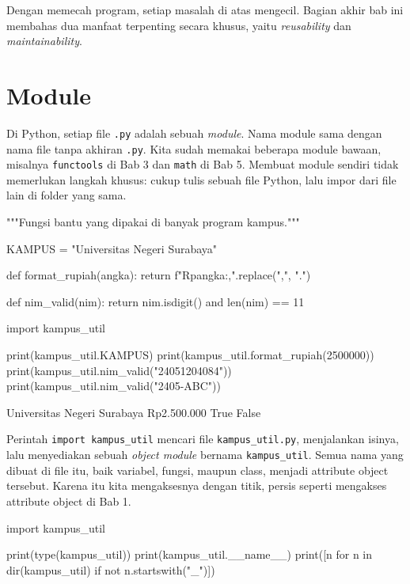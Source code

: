 Dengan memecah program, setiap masalah di atas mengecil. Bagian akhir bab ini membahas dua manfaat terpenting secara khusus, yaitu \emph{reusability} dan \emph{maintainability}.

\section{Module}

Di Python, setiap file \texttt{.py} adalah sebuah \emph{module}. Nama module sama dengan nama file tanpa akhiran \texttt{.py}. Kita sudah memakai beberapa module bawaan, misalnya \texttt{functools} di Bab 3 dan \texttt{math} di Bab 5. Membuat module sendiri tidak memerlukan langkah khusus: cukup tulis sebuah file Python, lalu impor dari file lain di folder yang sama.

\begin{kode}
"""Fungsi bantu yang dipakai di banyak program kampus."""

KAMPUS = "Universitas Negeri Surabaya"

def format_rupiah(angka):
    return f"Rp{angka:,}".replace(",", ".")

def nim_valid(nim):
    return nim.isdigit() and len(nim) == 11
\end{kode}

\begin{kode}[main.py]
import kampus_util

print(kampus_util.KAMPUS)
print(kampus_util.format_rupiah(2500000))
print(kampus_util.nim_valid("24051204084"))
print(kampus_util.nim_valid("2405-ABC"))
\end{kode}

\begin{keluaran}
Universitas Negeri Surabaya
Rp2.500.000
True
False
\end{keluaran}

Perintah \texttt{import kampus\_util} mencari file \texttt{kampus\_util.py}, menjalankan isinya, lalu menyediakan sebuah \emph{object module} bernama \texttt{kampus\_util}. Semua nama yang dibuat di file itu, baik variabel, fungsi, maupun class, menjadi attribute object tersebut. Karena itu kita mengaksesnya dengan titik, persis seperti mengakses attribute object di Bab 1.

\begin{kode}
import kampus_util

print(type(kampus_util))
print(kampus_util.__name__)
print([n for n in dir(kampus_util) if not n.startswith("_")])
\end{kode}

